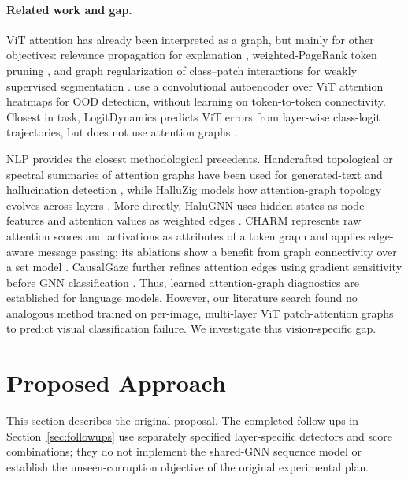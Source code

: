 \paragraph{Related work and gap.}
ViT attention has already been interpreted as a graph, but mainly for
other objectives: relevance propagation for explanation
\citep{chefer2021transformer}, weighted-PageRank token pruning
\citep{wang2024zerotprune}, and graph regularization of class--patch
interactions for weakly supervised segmentation
\citep{yang2025more}. \citet{cultrera2023leveraging} use a
convolutional autoencoder over ViT attention heatmaps for OOD
detection, without learning on token-to-token connectivity. Closest
in task, LogitDynamics predicts ViT errors from layer-wise class-logit
trajectories, but does not use attention graphs
\citep{beigelman2026logitdynamics}.

NLP provides the closest methodological precedents. Handcrafted
topological or spectral summaries of attention graphs have been used
for generated-text and hallucination detection
\citep{kushnareva2021artificial,binkowski2025hallucination}, while
HalluZig models how attention-graph topology evolves across layers
\citep{samaga2026halluzig}. More directly, HaluGNN uses hidden states
as node features and attention values as weighted edges
\citep{kong2026halugnn}. CHARM represents raw attention scores and
activations as attributes of a token graph and applies edge-aware
message passing; its ablations show a benefit from graph connectivity
over a set model \citep{frasca2026charm}. CausalGaze further refines
attention edges using gradient sensitivity before GNN classification
\citep{kong2026causalgaze}. Thus, learned attention-graph diagnostics
are established for language models. However, our literature search
found no analogous method trained on per-image, multi-layer ViT
patch-attention graphs to predict visual classification failure. We
investigate this vision-specific gap.

\section{Proposed Approach}

This section describes the original proposal. The completed follow-ups in
Section~\ref{sec:followups} use separately specified layer-specific detectors
and score combinations; they do not implement the shared-GNN sequence model
or establish the unseen-corruption objective of the original experimental plan.


